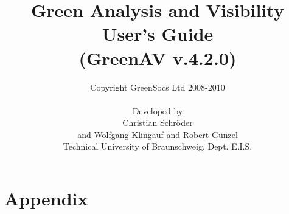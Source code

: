 \documentclass[a4paper,12pt,oneside]{gsbook}
\author{Copyright GreenSocs Ltd 2008-2010\\ \\Developed by\\Christian Schr\"oder\\ and Wolfgang Klingauf and Robert G\"unzel\\Technical University of Braunschweig, Dept. E.I.S.}
\title{Green Analysis and Visibility User's Guide\\(GreenAV v.4.2.0)}%
\begin{document}
\maketitle

\tableofcontents

\listoffigures





\appendix

	\chapter{Appendix}

	
\end{document}
